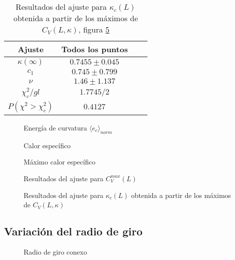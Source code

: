 \begin{table}
\begin{tabular}{|c|c|c|c|}\hline
 Ajuste   & Todos los puntos   \\ \hline
 $\kappa(\infty)$    & $0.7455\pm 0.045 $ \\ \hline
 $c_1$    & $0.745 \pm 0.799$ \\ \hline
 $\nu$ & $1.46\pm 1.137$  & \\ \hline
 $\chi_c^2/gl$ &  $1.7745/2$ & \\ \hline
 $P(\chi^2>\chi_c^2)$&  $0.4127$\\ \hline
\end{tabular}
\caption{Resultados del ajuste para $\kappa_c(L)$ obtenida a partir de los
  máximos de $C_V(L,\kappa)$, figura \ref{kappa_Cv_fig}}
\end{table}

\begin{figure}[h]
\centering
 
\caption{Energía de curvatura $\langle e_c\rangle_{norm}$}\label{Ec_fig}
\end{figure}

\begin{figure}[h]
  \centering
  
  \caption{Calor específico}\label{Cv_fig}
\end{figure}

\begin{figure}[h]
  \centering
  
  \caption{Máximo calor específico}\label{max_Cv_fig}
\end{figure}

\begin{figure}[h]
  \centering
  
  \caption{Resultados del ajuste para $C_V^{max}(L)$}\label{max_Cv_L_fig}
\end{figure}

\begin{figure}[h]
  \centering
  
  \caption{Resultados del ajuste para $\kappa_c(L)$ obtenida a partir de los
  máximos de $C_V(L,\kappa)$}\label{kappa_Cv_fig}
\end{figure}
\clearpage

\subsection{Variación del radio de giro}

\begin{figure}[h]
  \centering
  
  \caption{Radio de giro conexo}
\end{figure}

